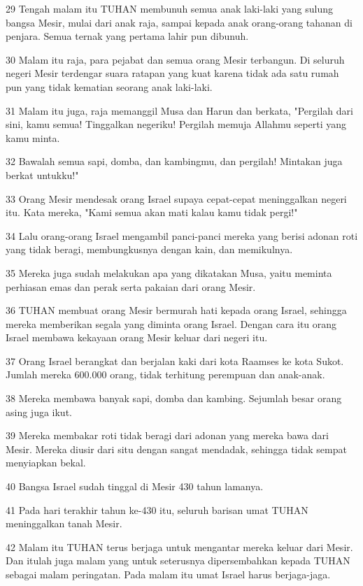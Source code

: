 \par 29 Tengah malam itu TUHAN membunuh semua anak laki-laki yang sulung bangsa Mesir, mulai dari anak raja, sampai kepada anak orang-orang tahanan di penjara. Semua ternak yang pertama lahir pun dibunuh.
\par 30 Malam itu raja, para pejabat dan semua orang Mesir terbangun. Di seluruh negeri Mesir terdengar suara ratapan yang kuat karena tidak ada satu rumah pun yang tidak kematian seorang anak laki-laki.
\par 31 Malam itu juga, raja memanggil Musa dan Harun dan berkata, "Pergilah dari sini, kamu semua! Tinggalkan negeriku! Pergilah memuja Allahmu seperti yang kamu minta.
\par 32 Bawalah semua sapi, domba, dan kambingmu, dan pergilah! Mintakan juga berkat untukku!"
\par 33 Orang Mesir mendesak orang Israel supaya cepat-cepat meninggalkan negeri itu. Kata mereka, "Kami semua akan mati kalau kamu tidak pergi!"
\par 34 Lalu orang-orang Israel mengambil panci-panci mereka yang berisi adonan roti yang tidak beragi, membungkusnya dengan kain, dan memikulnya.
\par 35 Mereka juga sudah melakukan apa yang dikatakan Musa, yaitu meminta perhiasan emas dan perak serta pakaian dari orang Mesir.
\par 36 TUHAN membuat orang Mesir bermurah hati kepada orang Israel, sehingga mereka memberikan segala yang diminta orang Israel. Dengan cara itu orang Israel membawa kekayaan orang Mesir keluar dari negeri itu.
\par 37 Orang Israel berangkat dan berjalan kaki dari kota Raamses ke kota Sukot. Jumlah mereka 600.000 orang, tidak terhitung perempuan dan anak-anak.
\par 38 Mereka membawa banyak sapi, domba dan kambing. Sejumlah besar orang asing juga ikut.
\par 39 Mereka membakar roti tidak beragi dari adonan yang mereka bawa dari Mesir. Mereka diusir dari situ dengan sangat mendadak, sehingga tidak sempat menyiapkan bekal.
\par 40 Bangsa Israel sudah tinggal di Mesir 430 tahun lamanya.
\par 41 Pada hari terakhir tahun ke-430 itu, seluruh barisan umat TUHAN meninggalkan tanah Mesir.
\par 42 Malam itu TUHAN terus berjaga untuk mengantar mereka keluar dari Mesir. Dan itulah juga malam yang untuk seterusnya dipersembahkan kepada TUHAN sebagai malam peringatan. Pada malam itu umat Israel harus berjaga-jaga.
